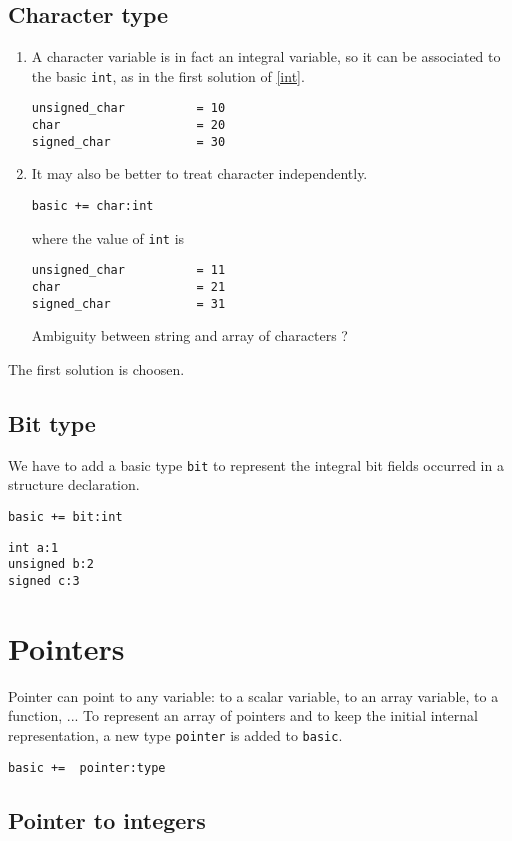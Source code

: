\documentclass[a4paper]{report}
\begin{document}
\subsection{Character type} 

\begin{enumerate}
\item A character variable is in fact an integral variable, so it can be
associated to the basic \verb/int/, as in the first solution of \ref{int}.
\begin{verbatim}
unsigned_char          = 10
char                   = 20
signed_char            = 30
\end{verbatim}
\item 
It may also be better to treat character independently. 

\verb/basic += char:int/

where the value of \verb/int/ is 
\begin{verbatim}
unsigned_char          = 11
char                   = 21
signed_char            = 31
\end{verbatim}
Ambiguity between string and array of characters ?
\end{enumerate}
The first solution is choosen.

\subsection{Bit type}

We have to add a basic type \verb/bit/ to represent the integral bit fields
occurred in a structure declaration.   

\verb/basic += bit:int/
\begin{verbatim}
int a:1 
unsigned b:2 
signed c:3
\end{verbatim}

\section{Pointers}

Pointer can point to any variable: to a scalar variable, to an array variable, to a function, ...
To represent an array of pointers and to keep the initial internal representation, a new type \verb/pointer/ is
added to \verb/basic/.   

\verb/basic +=  pointer:type/

\subsection{Pointer to integers}
\end{document}
